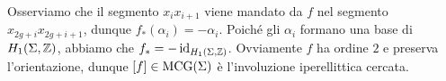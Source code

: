 Osserviamo che il segmento $x_ix_{i+1}$ viene mandato da $f$ nel segmento $x_{2g+i}x_{2g+i+1}$, dunque $f_*(\alpha_i)=-\alpha_i$. Poiché gli $\alpha_i$ formano una base di $H_1(\Sigma,\mathbb{Z})$, abbiamo che $f_*=-\operatorname{id}_{H_1(\Sigma,\mathbb{Z})}$. Ovviamente $f$ ha ordine $2$ e preserva l'orientazione, dunque $[f]\in\operatorname{MCG}(\Sigma)$ è l'involuzione iperellittica cercata.

\begin{comment}
\newpage
\subsection*{Esercizio 3.6}
Siano $[f]\in\MCG(S_g)$, $[m]\in\Teich(S_g)$ tali che $[f_*m]=[m]$. Ciò significa che esiste un diffeomorfismo $h$ di $S_g$ isotopo all'identità e tale che $f_*m=h_*m$. Ma allora $(h^{-1}\circ f)_*m=m$; poiché $h^{-1}\circ f$ e $f$ sono isotopi, essi rappresentano la stessa classe in $\MCG(S_g)$, dunque possiamo supporre (a meno di cambiare rappresentante) che $f_*m=m$. Ciò significa precisamente che $f$ è un'isometria per la superficie $S_g$ con la metrica $m$.

I punti singolari dello spazio dei moduli sono precisamente le (classi di) metriche che sono fissate da elementi non banali di $\MCG(S_g)$. Come abbiamo visto, se elemento $\varphi\in\MCG(S_g)$ fissa una classe $[m]\in\Teich(S_g)$, allora esiste un rappresentante $f$ di $\varphi$ (che non sarà isotopo all'identità se $\varphi$ è non banale) che è un'isometria per $S_g$ munita della metrica $m$.
\end{comment}